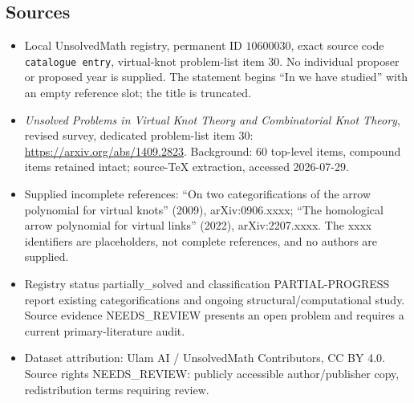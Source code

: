 \documentclass[11pt]{article}
\begin{document}
\subsection{Sources}
\begin{itemize}
\item Local UnsolvedMath registry, permanent ID \(10600030\), exact source code \texttt{catalogue entry}, virtual-knot problem-list item 30. No individual proposer or proposed year is supplied. The statement begins ``In we have studied'' with an empty reference slot; the title is truncated.
\item \emph{Unsolved Problems in Virtual Knot Theory and Combinatorial Knot Theory}, revised survey, dedicated problem-list item 30: \url{https://arxiv.org/abs/1409.2823}. Background: 60 top-level items, compound items retained intact; source-TeX extraction, accessed 2026-07-29.
\item Supplied incomplete references: ``On two categorifications of the arrow polynomial for virtual knots'' (2009), arXiv:0906.xxxx; ``The homological arrow polynomial for virtual links'' (2022), arXiv:2207.xxxx. The xxxx identifiers are placeholders, not complete references, and no authors are supplied.
\item Registry status partially\_solved and classification PARTIAL-PROGRESS report existing categorifications and ongoing structural/computational study. Source evidence NEEDS\_REVIEW presents an open problem and requires a current primary-literature audit.
\item Dataset attribution: Ulam AI / UnsolvedMath Contributors, CC BY 4.0. Source rights NEEDS\_REVIEW: publicly accessible author/publisher copy, redistribution terms requiring review.
\end{itemize}
\end{document}
